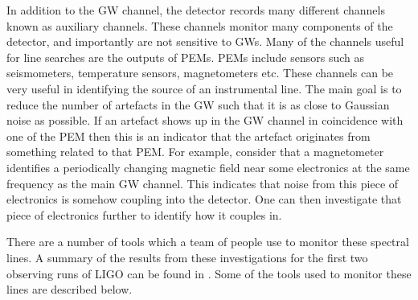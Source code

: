 %
In addition to the \gls{GW} channel, the detector
records many different channels known as auxiliary channels.  These channels
monitor many components of the detector, and importantly are not sensitive to
\glspl{GW}.  Many of the channels useful for line searches are the outputs of \glspl{PEM}.
\glspl{PEM} include sensors such as seismometers, temperature sensors,
magnetometers etc.  These channels can be very useful in identifying the source
of an instrumental line.  The main goal is to reduce the number of artefacts in
the \gls{GW} such that it is as close to Gaussian noise as possible.  If an
artefact shows up in the \gls{GW} channel in coincidence with one of the
\gls{PEM} then this is an indicator that the artefact originates from something
related to that \gls{PEM}.  For example, consider
that a magnetometer identifies a periodically changing magnetic field near some electronics  at the same frequency as
the main \gls{GW} channel.  This indicates that noise from this piece of
electronics is somehow coupling into the detector.  One can then investigate
that piece of electronics further to identify how it couples in.

%

There are a number of tools which a team of people use to monitor these spectral lines.
A summary of the results from these investigations for the first two observing runs of \gls{LIGO} can be found in
\citep{covas2018IdentificationMitigation}.  Some of the tools used to monitor these lines are
described below.

